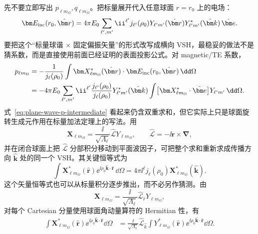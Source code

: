 先不要立即写出 $p_{\ell m_{\Omega}},q_{\ell m_{\Omega}}$。把标量展开代入任意球面 $r=r_0$ 上的电场：
\begin{equation}
\bm E_{\rm inc}(r_0,\hat{\bm r})
=4\pi E_0\sum_{\ell',m'}
\ii^{\ell'}j_{\ell'}(\rho_0)
Y_{\ell'm'}(\hat{\bm r})
Y_{\ell'm'}^*(\hat{\bm k})\,\hat{\bm e}.
\label{eq:plane-wave-scalar-expanded-vector}
\end{equation}
要把这个“标量球谐 $\times$ 固定偏振矢量”的形式改写成横向 VSH，最稳妥的做法不是猜系数，而是直接使用前面已经证明的表面投影公式。对 magnetic/TE 系数，
\begin{align}
p_{\ell m_{\Omega}}
&=-\frac{1}{j_\ell(\rho_0)}
\int\bm X_{\ell m_{\Omega}}^*(\hat{\bm r})\cdot
\bm E_{\rm inc}(r_0,\hat{\bm r})\,\dd\Omega\\
&=-4\pi E_0\sum_{\ell',m'}
\ii^{\ell'}\frac{j_{\ell'}(\rho_0)}{j_\ell(\rho_0)}
Y_{\ell'm'}^*(\hat{\bm k})
\int
\bigl[\bm X_{\ell m_{\Omega}}^*\cdot\hat{\bm e}\bigr]
Y_{\ell'm'}\,\dd\Omega.
\label{eq:plane-wave-p-intermediate}
\end{align}
式~\eqref{eq:plane-wave-p-intermediate} 看起来仍含双重求和，但它实际上只是球面旋转生成元作用在标量加法定理上的写法。用
\begin{equation}
\bm X_{\ell m_{\Omega}}
=\frac{\ii}{\sqrt{\Lambda_\ell}}
\widehat{\bm{\mathcal L}}Y_{\ell m_{\Omega}},
\qquad
\widehat{\bm{\mathcal L}}=-\ii\bm r\times\bm\nabla,
\end{equation}
并在闭合球面上把 $\widehat{\bm{\mathcal L}}$ 分部积分移动到平面波因子，可把整个求和重新求成传播方向 $\hat{\bm k}$ 处的同一个 VSH。其关键恒等式为
\begin{equation}
\int\bm X_{\ell m_{\Omega}}^*(\hat{\bm r})
\ee^{\ii\rho_0\hat{\bm k}\cdot\hat{\bm r}}\,\dd\Omega
=4\pi\ii^\ell j_\ell(\rho_0)
\bm X_{\ell m_{\Omega}}^*(\hat{\bm k}).
\label{eq:vector-plane-wave-X-integral}
\end{equation}
这个矢量恒等式也可以从标量积分逐步推出，而不必另作猜测。由
\begin{equation}
\bm X_{\ell m_\Omega}
=\frac{\ii}{\sqrt{\Lambda_\ell}}\widehat{\bm{\mathcal L}}_{\hat r}Y_{\ell m_\Omega},
\end{equation}
对每个 Cartesian 分量使用球面角动量算符的 Hermitian 性，有
\begin{align}
\int \bm X_{\ell m_\Omega}^*(\hat{\bm r})
\ee^{\ii\rho_0\hat{\bm k}\cdot\hat{\bm r}}\dd\Omega
&=\frac{\ii}{\sqrt{\Lambda_\ell}}
\widehat{\bm{\mathcal L}}_{\hat k}
\int Y_{\ell m_\Omega}^*(\hat{\bm r})
\ee^{\ii\rho_0\hat{\bm k}\cdot\hat{\bm r}}\dd\Omega.
\label{eq:X-integral-angular-momentum-step}
\end{align}

